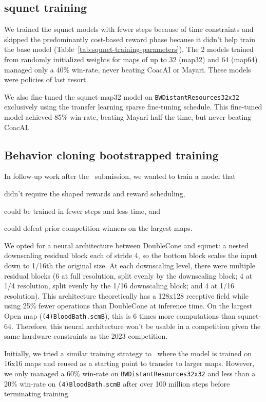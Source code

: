 \documentclass{article}
\begin{document}
\subsection{squnet training}
We trained the squnet models with fewer steps because of time constraints and skipped the
predominantly cost-based reward phase because it didn't help train the
base model (Table~\ref{tab:squnet-training-parameters}). The 2 models trained from randomly 
initialized weights for maps of up to 32 (map32) and 64 (map64) managed only a 40\% 
win-rate, never beating CoacAI or Mayari. These models were policies of last resort.

We also fine-tuned the squnet-map32 model on \texttt{BWDistantResources32x32}
exclusively using the transfer learning sparse fine-tuning schedule. This fine-tuned 
model achieved 85\% win-rate, beating Mayari half the time, but never beating CoacAI.

\subsection{Behavior cloning bootstrapped training}
In follow-up work after the \agentName\ submission, we wanted to train a model that
\begin{inparaenum}[(1)]
    \item didn't require the shaped rewards and reward scheduling,
    \item could be trained in fewer steps and less time, and
    \item could defeat prior competition winners on the largest maps.
\end{inparaenum}
We opted for a neural architecture between DoubleCone and squnet: a nested downscaling residual
block each of stride 4, so the bottom block scales the input down to 1/16th the original
size. At each downscaling level, there were multiple residual blocks (6 at full
resolution, split evenly by the downscaling block; 4 at 1/4 resolution, split evenly by
the 1/16 downscaling block; and 4 at 1/16 resolution). This architecture theoretically
has a 128x128 receptive field while using 25\% fewer operations than DoubleCone at inference time. On
the largest Open map (\texttt{(4)BloodBath.scmB}), this is 6 times more
computations than squnet-64. Therefore, this neural architecture won't be usable in a
competition given the same hardware constraints as the 2023 competition.

Initially, we tried a similar training strategy to \agentName\ where the model is
trained on 16x16 maps and reused as a starting point to transfer to
larger maps. However, we only managed a 60\% win-rate on
\texttt{BWDistantResources32x32} and less than a 20\% win-rate on
\texttt{(4)BloodBath.scmB} after over 100 million
steps before terminating training.
\end{document}
